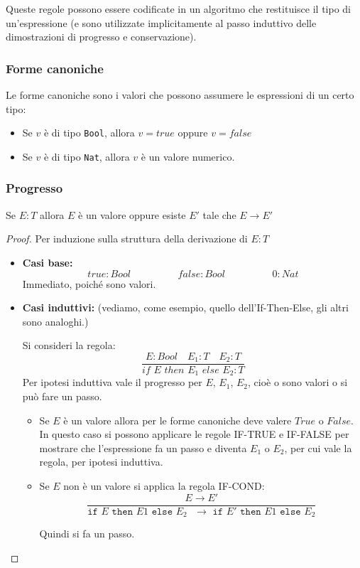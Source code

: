 \documentclass[a4paper,10pt]{article}
\begin{document}
    Queste regole possono essere codificate in un algoritmo che restituisce il tipo di un'espressione (e sono utilizzate implicitamente al passo induttivo delle dimostrazioni di progresso e conservazione).
    
    \subsubsection{Forme canoniche}
    Le forme canoniche sono i valori che possono assumere le espressioni di un certo tipo:
    \begin{itemize}
     \item Se $v$ è di tipo \texttt{Bool}, allora $v = true$ oppure $v = false$
     \item Se $v$ è di tipo \texttt{Nat}, allora $v$ è un valore numerico.
    \end{itemize}
\newpage
    \subsubsection{Progresso}
    Se $E:T$ allora $E$ è un valore oppure esiste $E'$ tale che $E \to E'$
    
    \begin{proof}
    Per induzione sulla struttura della derivazione di $E:T$
    
    \begin{itemize}
     \item \textbf{Casi base:} 
     \[true : Bool \hspace{2cm} false: Bool \hspace{2cm} 0:Nat\]
     Immediato, poiché sono valori.
     \item \textbf{Casi induttivi:} (vediamo, come esempio, quello dell'If-Then-Else, gli altri sono analoghi.)
     
     Si consideri la regola:
     \[\dfrac{E : Bool\quad E_1 : T\quad E_2:T}{if\,\, E\,\, then\,\, E_1\,\, else\,\, E_2 : T}\]
     Per ipotesi induttiva vale il progresso per $E$, $E_1$, $E_2$, cioè o sono valori o si può fare un passo.
     
     \begin{itemize}
      \item Se $E$ è un valore allora per le forme canoniche deve valere $True$ o $False$. In questo caso si possono applicare le regole IF-TRUE e IF-FALSE per mostrare che l'espressione fa un passo e diventa $E_1$ o $E_2$, per cui vale la regola, per ipotesi induttiva.
      \item Se $E$ non è un valore si applica la regola IF-COND:
      \[\dfrac{E \to E'}{\texttt{if $E$ then $E1$ else $E_2$ $\to $ if $E'$ then $E1$ else $E_2$}}\]
      
      Quindi si fa un passo.
     \end{itemize}

    \end{itemize}
 
    \end{proof}
\end{document}
